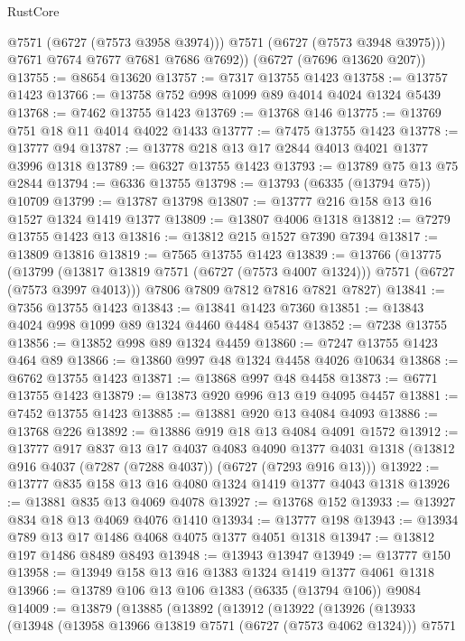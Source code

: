 \begin{lexlean}{RustCore}
\begin{coremodule}
            @7571
            (@6727 (@7573 @3958 @3974)))
          @7571
          (@6727 (@7573 @3948 @3975)))
        @7671
        @7674
        @7677
        @7681
        @7686
        @7692))
    (@6727 (@7696 @13620 @207))
@13755 := @8654 @13620
@13757 := @7317 @13755 @1423
@13758 := @13757 @1423
@13766 := @13758 @752 @998 @1099 @89 @4014 @4024 @1324 @5439
@13768 := @7462 @13755 @1423
@13769 := @13768 @146
@13775 := @13769 @751 @18 @11 @4014 @4022 @1433
@13777 := @7475 @13755 @1423
@13778 := @13777 @94
@13787 := @13778 @218 @13 @17 @2844 @4013 @4021 @1377 @3996 @1318
@13789 := @6327 @13755 @1423
@13793 := @13789 @75 @13 @75 @2844
@13794 := @6336 @13755
@13798 := @13793 (@6335 (@13794 @75)) @10709
@13799 := @13787 @13798
@13807 := @13777 @216 @158 @13 @16 @1527 @1324 @1419 @1377
@13809 := @13807 @4006 @1318
@13812 := @7279 @13755 @1423 @13
@13816 := @13812 @215 @1527 @7390 @7394
@13817 := @13809 @13816
@13819 := @7565 @13755 @1423
@13839 := @13766
    (@13775
      (@13799 (@13817 @13819 @7571 (@6727 (@7573 @4007 @1324))) @7571 (@6727 (@7573 @3997 @4013)))
      @7806
      @7809
      @7812
      @7816
      @7821
      @7827)
@13841 := @7356 @13755 @1423
@13843 := @13841 @1423 @7360
@13851 := @13843 @4024 @998 @1099 @89 @1324 @4460 @4484 @5437
@13852 := @7238 @13755
@13856 := @13852 @998 @89 @1324 @4459
@13860 := @7247 @13755 @1423 @464 @89
@13866 := @13860 @997 @48 @1324 @4458 @4026 @10634
@13868 := @6762 @13755 @1423
@13871 := @13868 @997 @48 @4458
@13873 := @6771 @13755 @1423
@13879 := @13873 @920 @996 @13 @19 @4095 @4457
@13881 := @7452 @13755 @1423
@13885 := @13881 @920 @13 @4084 @4093
@13886 := @13768 @226
@13892 := @13886 @919 @18 @13 @4084 @4091 @1572
@13912 := @13777
    @917
    @837
    @13
    @17
    @4037
    @4083
    @4090
    @1377
    @4031
    @1318
    (@13812 @916 @4037 (@7287 (@7288 @4037)) (@6727 (@7293 @916 @13)))
@13922 := @13777 @835 @158 @13 @16 @4080 @1324 @1419 @1377 @4043 @1318
@13926 := @13881 @835 @13 @4069 @4078
@13927 := @13768 @152
@13933 := @13927 @834 @18 @13 @4069 @4076 @1410
@13934 := @13777 @198
@13943 := @13934 @789 @13 @17 @1486 @4068 @4075 @1377 @4051 @1318
@13947 := @13812 @197 @1486 @8489 @8493
@13948 := @13943 @13947
@13949 := @13777 @150
@13958 := @13949 @158 @13 @16 @1383 @1324 @1419 @1377 @4061 @1318
@13966 := @13789 @106 @13 @106 @1383 (@6335 (@13794 @106)) @9084
@14009 := @13879
    (@13885
      (@13892
        (@13912
          (@13922
            (@13926
              (@13933
                (@13948
                  (@13958 @13966 @13819 @7571 (@6727 (@7573 @4062 @1324)))
                  @7571

\end{coremodule}
\end{lexlean}

